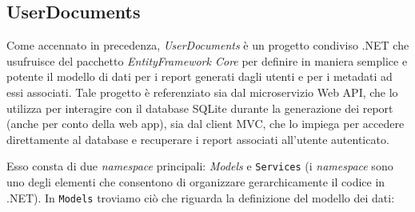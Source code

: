 \subsection{UserDocuments}
Come accennato in precedenza, \emph{UserDocuments} è un progetto condiviso .NET che usufruisce del pacchetto \emph{EntityFramework Core} per definire in maniera semplice e potente il modello di dati per i report generati dagli utenti e per i metadati ad essi associati. Tale progetto è referenziato sia dal microservizio Web API, che lo utilizza per interagire con il database SQLite durante la generazione dei report (anche per conto della web app), sia dal client MVC, che lo impiega per accedere direttamente al database e recuperare i report associati all'utente autenticato.

Esso consta di due \emph{namespace} principali: \emph{Models} e \texttt{Services} (i \emph{namespace} sono uno degli elementi che consentono di organizzare gerarchicamente il codice in .NET).
In \texttt{Models} troviamo ciò che riguarda la definizione del modello dei dati:
